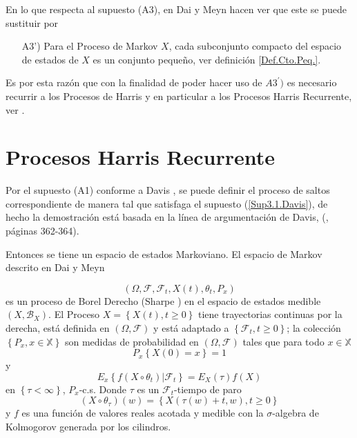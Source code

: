 \documentclass{article}
\numberwithin{equation}{section}
\begin{document}
En lo que respecta al supuesto (A3), en Dai y Meyn \cite{DaiSean} hacen ver que este se puede sustituir por

\begin{itemize}
\item[A3')] Para el Proceso de Markov $X$, cada subconjunto compacto del espacio de estados de $X$ es un conjunto peque\~no, ver definici\'on \ref{Def.Cto.Peq.}.
\end{itemize}

Es por esta raz\'on que con la finalidad de poder hacer uso de $A3^{'})$ es necesario recurrir a los Procesos de Harris y en particular a los Procesos Harris Recurrente, ver \cite{Dai, DaiSean}.

\section{Procesos Harris Recurrente}

Por el supuesto (A1) conforme a Davis \cite{Davis}, se puede definir el proceso de saltos correspondiente de manera tal que satisfaga el supuesto (\ref{Sup3.1.Davis}), de hecho la demostraci\'on est\'a basada en la l\'inea de argumentaci\'on de Davis, (\cite{Davis}, p\'aginas 362-364).

Entonces se tiene un espacio de estados Markoviano. El espacio de Markov descrito en Dai y Meyn \cite{DaiSean}

\[\left(\Omega,\mathcal{F},\mathcal{F}_{t},X\left(t\right),\theta_{t},P_{x}\right)\] es un proceso de Borel Derecho (Sharpe \cite{Sharpe}) en el espacio de estados medible $\left(X,\mathcal{B}_{X}\right)$. El Proceso $X=\left\{X\left(t\right),t\geq0\right\}$ tiene trayectorias continuas por la derecha, est\'a definida en $\left(\Omega,\mathcal{F}\right)$ y est\'a adaptado a $\left\{\mathcal{F}_{t},t\geq0\right\}$; la colecci\'on $\left\{P_{x},x\in \mathbb{X}\right\}$ son medidas de probabilidad en $\left(\Omega,\mathcal{F}\right)$ tales que para todo $x\in \mathbb{X}$ \[P_{x}\left\{X\left(0\right)=x\right\}=1\] y \[E_{x}\left\{f\left(X\circ\theta_{t}\right)|\mathcal{F}_{t}\right\}=E_{X}\left(\tau\right)f\left(X\right)\] en $\left\{\tau<\infty\right\}$, $P_{x}$-c.s. Donde $\tau$ es un $\mathcal{F}_{t}$-tiempo de paro \[\left(X\circ\theta_{\tau}\right)\left(w\right)=\left\{X\left(\tau\left(w\right)+t,w\right),t\geq0\right\}\] y $f$ es una funci\'on de valores reales acotada y medible con la $\sigma$-algebra de Kolmogorov generada por los cilindros.\\
\end{document}
